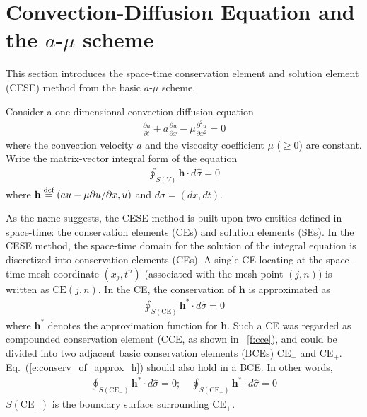 \documentclass{turgon}
\begin{document}
\section{Convection-Diffusion Equation and the $a$-$\mu$ scheme}
\label{s:cese_intro}

This section introduces the space-time conservation element and solution
element (CESE) method from the basic $a$-$\mu$ scheme.

Consider a one-dimensional convection-diffusion equation
\begin{align}
    \frac{\partial u}{\partial t} + a\frac{\partial u}{\partial x}
  - \mu\frac{\partial^2u}{\partial x^2} = 0 \label{e:conv_diff_govern}
\end{align}
where the convection velocity $a$ and the viscosity coefficient $\mu$ ($\ge0$)
are constant.  Write the matrix-vector integral form of the equation
\begin{align}
  \oint_{S(V)}\mathbf{h}\cdot d\hat{\sigma}=0 \label{e:conservation}
\end{align}
where $\mathbf{h} \defeq (au-\mu\partial u/\partial x,u)$ and $d\hat{\sigma} =
(dx, dt)$.

As the name suggests, the CESE method is built upon two entities defined in
space-time: the conservation elements (CEs) and solution elements (SEs).  In
the CESE method, the space-time domain for the solution of the integral
equation is discretized into conservation elements (CEs).  A single CE locating
at the space-time mesh coordinate $(x_j, t^n)$ (associated with the mesh point
$(j,n)$) is written as $\mathrm{CE}(j,n)$.  In the CE, the conservation of
$\mathbf{h}$ is approximated as
\begin{align}
  \oint_{S(\mathrm{CE})}\mathbf{h}^*\cdot d\hat{\sigma} = 0
  \label{e:conserv_of_approx_h}
\end{align}
where $\mathbf{h}^*$ denotes the approximation function for $\mathbf{h}$.  Such
a CE was regarded as compounded conservation element (CCE, as shown in
\figurename~\ref{f:cce}), and could be divided into two adjacent basic
conservation elements (BCEs) $\mathrm{CE}_-$ and $\mathrm{CE}_+$.
Eq.~(\ref{e:conserv_of_approx_h}) should also hold in a BCE.  In other words,
\begin{align*}
  \oint_{S(\mathrm{CE}_-)}\mathbf{h}^*\cdot d\hat{\sigma} = 0; \quad
  \oint_{S(\mathrm{CE}_+)}\mathbf{h}^*\cdot d\hat{\sigma} = 0
\end{align*}
$S(\mathrm{CE}_{\pm})$ is the boundary surface surrounding $\mathrm{CE}_{\pm}$.
\end{document}
